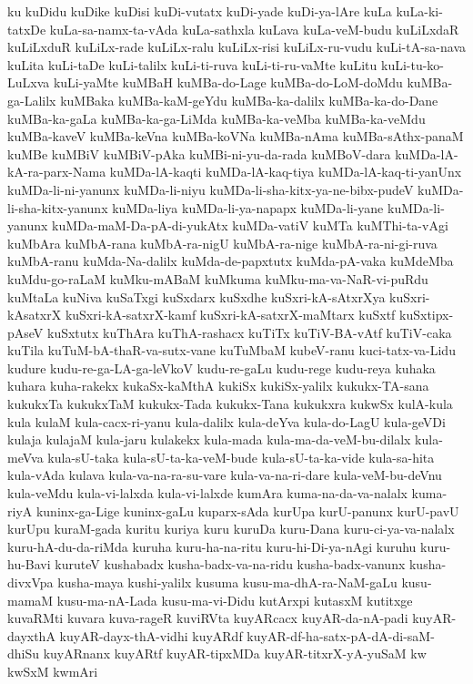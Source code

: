 {ku
kuDidu
kuDike
kuDisi
kuDi-vutatx
kuDi-yade
kuDi-ya-lAre
kuLa
kuLa-ki-tatxDe
kuLa-sa-namx-ta-vAda
kuLa-sathxla
kuLava
kuLa-veM-budu
kuLiLxdaR
kuLiLxduR
kuLiLx-rade
kuLiLx-ralu
kuLiLx-risi
kuLiLx-ru-vudu
kuLi-tA-sa-nava
kuLita
kuLi-taDe
kuLi-talilx
kuLi-ti-ruva
kuLi-ti-ru-vaMte
kuLitu
kuLi-tu-ko-LuLxva
kuLi-yaMte
kuMBaH
kuMBa-do-Lage
kuMBa-do-LoM-doMdu
kuMBa-ga-Lalilx
kuMBaka
kuMBa-kaM-geYdu
kuMBa-ka-dalilx
kuMBa-ka-do-Dane
kuMBa-ka-gaLa
kuMBa-ka-ga-LiMda
kuMBa-ka-veMba
kuMBa-ka-veMdu
kuMBa-kaveV
kuMBa-keVna
kuMBa-koVNa
kuMBa-nAma
kuMBa-sAthx-panaM
kuMBe
kuMBiV
kuMBiV-pAka
kuMBi-ni-yu-da-rada
kuMBoV-dara
kuMDa-lA-kA-ra-parx-Nama
kuMDa-lA-kaqti
kuMDa-lA-kaq-tiya
kuMDa-lA-kaq-ti-yanUnx
kuMDa-li-ni-yanunx
kuMDa-li-niyu
kuMDa-li-sha-kitx-ya-ne-bibx-pudeV
kuMDa-li-sha-kitx-yanunx
kuMDa-liya
kuMDa-li-ya-napapx
kuMDa-li-yane
kuMDa-li-yanunx
kuMDa-maM-Da-pA-di-yukAtx
kuMDa-vatiV
kuMTa
kuMThi-ta-vAgi
kuMbAra
kuMbA-rana
kuMbA-ra-nigU
kuMbA-ra-nige
kuMbA-ra-ni-gi-ruva
kuMbA-ranu
kuMda-Na-dalilx
kuMda-de-papxtutx
kuMda-pA-vaka
kuMdeMba
kuMdu-go-raLaM
kuMku-mABaM
kuMkuma
kuMku-ma-va-NaR-vi-puRdu
kuMtaLa
kuNiva
kuSaTxgi
kuSxdarx
kuSxdhe
kuSxri-kA-sAtxrXya
kuSxri-kAsatxrX
kuSxri-kA-satxrX-kamf
kuSxri-kA-satxrX-maMtarx
kuSxtf
kuSxtipx-pAseV
kuSxtutx
kuThAra
kuThA-rashacx
kuTiTx
kuTiV-BA-vAtf
kuTiV-caka
kuTila
kuTuM-bA-thaR-va-sutx-vane
kuTuMbaM
kubeV-ranu
kuci-tatx-va-Lidu
kudure
kudu-re-ga-LA-ga-leVkoV
kudu-re-gaLu
kudu-rege
kudu-reya
kuhaka
kuhara
kuha-rakekx
kukaSx-kaMthA
kukiSx
kukiSx-yalilx
kukukx-TA-sana
kukukxTa
kukukxTaM
kukukx-Tada
kukukx-Tana
kukukxra
kukwSx
kulA-kula
kula
kulaM
kula-cacx-ri-yanu
kula-dalilx
kula-deYva
kula-do-LagU
kula-geVDi
kulaja
kulajaM
kula-jaru
kulakekx
kula-mada
kula-ma-da-veM-bu-dilalx
kula-meVva
kula-sU-taka
kula-sU-ta-ka-veM-bude
kula-sU-ta-ka-vide
kula-sa-hita
kula-vAda
kulava
kula-va-na-ra-su-vare
kula-va-na-ri-dare
kula-veM-bu-deVnu
kula-veMdu
kula-vi-lalxda
kula-vi-lalxde
kumAra
kuma-na-da-va-nalalx
kuma-riyA
kuninx-ga-Lige
kuninx-gaLu
kuparx-sAda
kurUpa
kurU-panunx
kurU-pavU
kurUpu
kuraM-gada
kuritu
kuriya
kuru
kuruDa
kuru-Dana
kuru-ci-ya-va-nalalx
kuru-hA-du-da-riMda
kuruha
kuru-ha-na-ritu
kuru-hi-Di-ya-nAgi
kuruhu
kuru-hu-Bavi
kuruteV
kushabadx
kusha-badx-va-na-ridu
kusha-badx-vanunx
kusha-divxVpa
kusha-maya
kushi-yalilx
kusuma
kusu-ma-dhA-ra-NaM-gaLu
kusu-mamaM
kusu-ma-nA-Lada
kusu-ma-vi-Didu
kutArxpi
kutasxM
kutitxge
kuvaRMti
kuvara
kuva-rageR
kuviRVta
kuyARcacx
kuyAR-da-nA-padi
kuyAR-dayxthA
kuyAR-dayx-thA-vidhi
kuyARdf
kuyAR-df-ha-satx-pA-dA-di-saM-dhiSu
kuyARnanx
kuyARtf
kuyAR-tipxMDa
kuyAR-titxrX-yA-yuSaM
kw
kwSxM
kwmAri
}
